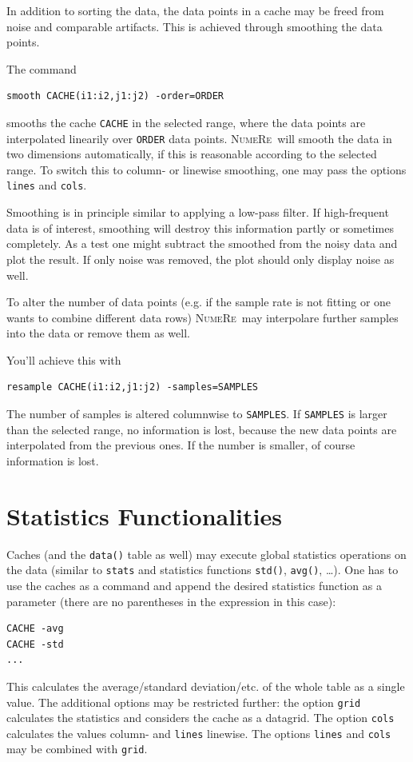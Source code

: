 \documentclass[DIV=14,headsepline,footsepline]{scrbook}
\newcommand{\NR}{\textsc{Nu\-me\-Re}}
\begin{document}
				In addition to sorting the data, the data points in a cache may be freed from noise and comparable artifacts. This is achieved through smoothing the data points.
				
				The command
				\begin{lstlisting}
smooth CACHE(i1:i2,j1:j2) -order=ORDER
				\end{lstlisting}
				smooths the cache \verb+CACHE+ in the selected range, where the data points are interpolated linearily over \verb+ORDER+ data points. \NR\ will smooth the data in two dimensions automatically, if this is reasonable according to the selected range. To switch this to column- or linewise smoothing, one may pass the options \verb+lines+ and \verb+cols+.
				
				Smoothing is in principle similar to applying a low-pass filter. If high-frequent data is of interest, smoothing will destroy this information partly or sometimes completely. As a test one might subtract the smoothed from the noisy data and plot the result. If only noise was removed, the plot should only display noise as well.
				
				To alter the number of data points (e.g. if the sample rate is not fitting or one wants to combine different data rows) \NR\ may interpolare further samples into the data or remove them as well.
				
				You'll achieve this with
				\begin{lstlisting}
resample CACHE(i1:i2,j1:j2) -samples=SAMPLES
				\end{lstlisting}
				The number of samples is altered columnwise to \verb+SAMPLES+. If \verb+SAMPLES+ is larger than the selected range, no information is lost, because the new data points are interpolated from the previous ones. If the number is smaller, of course information is lost.
				
			\section{Statistics Functionalities}
				Caches (and the \verb+data()+ table as well) may execute global statistics operations on the data (similar to \verb+stats+ and statistics functions \verb+std()+, \verb+avg()+, \ldots). One has to use the caches as a command and append the desired statistics function as a parameter (there are no parentheses in the expression in this case):
				\begin{lstlisting}
CACHE -avg
CACHE -std
...
				\end{lstlisting}
				This calculates the average/standard deviation/etc. of the whole table as a single value. The additional options may be restricted further: the option \verb+grid+ calculates the statistics and considers the cache as a datagrid. The option \verb+cols+ calculates the values column- and \verb+lines+ linewise. The options \verb+lines+ and \verb+cols+ may be combined with \verb+grid+.
\end{document}
